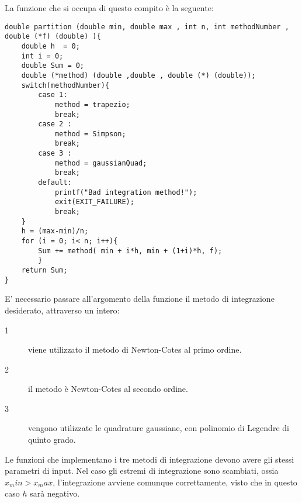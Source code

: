 La funzione che si occupa di questo compito è la seguente:
\begin{verbatim}
double partition (double min, double max , int n, int methodNumber , double (*f) (double) ){
	double h  = 0;
	int i = 0;
	double Sum = 0;
	double (*method) (double ,double , double (*) (double));
	switch(methodNumber){
		case 1:
			method = trapezio;
			break;
		case 2 :
			method = Simpson;
			break;
		case 3 :
			method = gaussianQuad;
			break;
		default:
			printf("Bad integration method!");
			exit(EXIT_FAILURE);
			break;
	}
	h = (max-min)/n;
	for (i = 0; i< n; i++){
		Sum += method( min + i*h, min + (1+i)*h, f);
		}
	return Sum;
}
\end{verbatim}
E' necessario passare all'argomento della funzione il metodo di integrazione desiderato, attraverso un intero:
\begin{description}
\item[1] viene utilizzato il metodo di Newton-Cotes al primo ordine. \\
\item[2] il metodo è Newton-Cotes al secondo ordine. \\
\item[3] vengono utilizzate le quadrature gaussiane, con polinomio di Legendre di quinto grado.\\
\end{description}
Le funzioni che implementano i tre metodi di integrazione devono avere gli stessi parametri di input.
Nel caso gli estremi di integrazione sono scambiati, ossia $x_min > x_max$, l'integrazione avviene comunque correttamente, visto che in questo caso $h$ sarà negativo.
